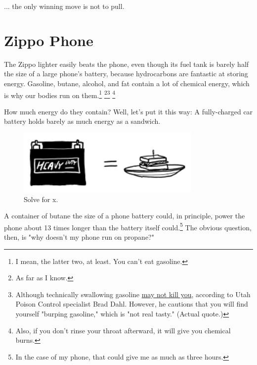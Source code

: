 {{... the only winning move is not to pull.}

{
\chapter{Zippo Phone}
}

\hfill{}

{The Zippo lighter easily beats the phone, even though its fuel tank is barely half the size of a large phone's battery, because hydrocarbons are fantastic at storing energy. Gasoline, butane, alcohol, and fat contain a lot of chemical energy, which is why our bodies run on them.{\footnote{I mean, the latter two, at least. You can't eat gasoline.} } ​{\footnote{As far as I know.} } ​{\footnote{Although technically swallowing gasoline \href{http://healthcare.utah.edu/the-scope/shows.php?shows=0\_g9tzppx4}{may not kill you}, according to Utah Poison Control specialist Brad Dahl. However, he cautions that you will find yourself "burping gasoline," which is "not real tasty." (Actual quote.)} } ​{\footnote{Also, if you don't rinse your throat afterward, it will give you chemical burns.} } }

{How much energy do they contain? Well, let's put it this way: A fully-charged car battery holds barely as much energy as a sandwich.}

\begin{figure}[!htbp]
\centering
\includegraphics[scale=0.5, max width=0.8\textwidth]{imgs/a/128/sandwich.png}
\caption{Solve for x.}
\end{figure}

{A container of butane the size of a phone battery could, in principle, power the phone about 13 times longer than the battery itself could.{\footnote{In the case of my phone, that could give me as much as three hours.} } The obvious question, then, is "why doesn't my phone run on propane?"}

}
